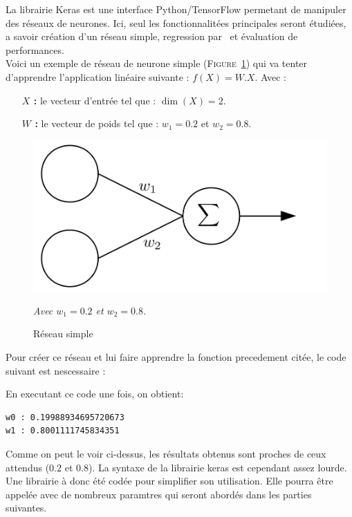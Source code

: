 La librairie Keras est une interface Python/TensorFlow\cite{tf} permetant de manipuler des réseaux de neurones.
Ici, seul les fonctionnalitées principales seront étudiées,
a savoir
création d'un réseau simple,
regression par \sgd\
et évaluation de performances.\\


Voici un exemple de réseau de neurone simple (\textsc{Figure}\ \ref{fig:net2})
qui va tenter d'apprendre l'application linéaire suivante : $f(X) = W.X$.
Avec :
\begin{itemize}
    \item[\textbf{$X$ :}] le vecteur d'entrée tel que : $\dim(X) = 2$.
    \item[\textbf{$W$ :}] le vecteur de poids tel que : $w_1 = 0.2$ et $w_2 = 0.8$.
\end{itemize}
\begin{figure}[H]
    \center
    \includegraphics[height=\petit]{pict/net2.png}
	\caption{Réseau simple}
    \vspace{-10pt}
    \begin{center}
        \tiny
        \textit{
        Avec $w_1 = 0.2$ et $w_2 = 0.8$.
        }
    \end{center}
	\label{fig:net2}
\end{figure}
\vspace{-12pt}


Pour créer ce réseau et lui faire apprendre la fonction precedement citée,
le code suivant est nescessaire :



En executant ce code une fois, on obtient:
\begin{lstlisting}
w0 : 0.19988934695720673
w1 : 0.8001111745834351
\end{lstlisting}

Comme on peut le voir ci-dessus, les résultats obtenus sont proches de ceux attendus ($0.2$ et $0.8$).
La syntaxe de la librairie keras est cependant assez lourde.
Une librairie à donc été codée pour simplifier son utilisation.
Elle pourra être appelée avec de nombreux paramtres qui seront abordés dans les parties suivantes.\\


